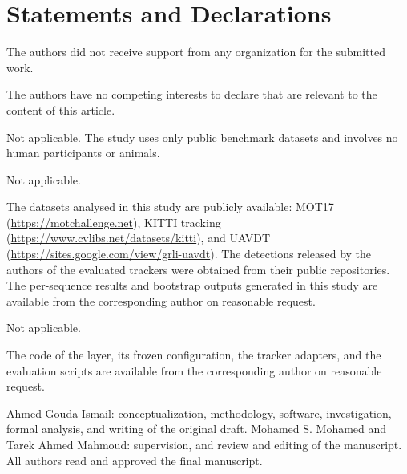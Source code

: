 \documentclass[pdflatex,referee,sn-mathphys-num]{sn-jnl}
\begin{document}
\maketitle











\backmatter

\section*{Statements and Declarations}

The authors did not receive support from any organization for the submitted work.

The authors have no competing interests to declare that are relevant to the content of this
article.

Not applicable. The study uses only public benchmark datasets and involves no human participants
or animals.

Not applicable.

The datasets analysed in this study are publicly available: MOT17
(\url{https://motchallenge.net}), KITTI tracking (\url{https://www.cvlibs.net/datasets/kitti}), and UAVDT
(\url{https://sites.google.com/view/grli-uavdt}).
The detections released by the authors of the evaluated trackers were obtained from their public
repositories. The per-sequence results and bootstrap outputs generated in this study are available
from the corresponding author on reasonable request.

Not applicable.

The code of the layer, its frozen configuration, the tracker adapters, and the evaluation scripts
are available from the corresponding author on reasonable request.

Ahmed Gouda Ismail: conceptualization, methodology, software, investigation, formal analysis, and
writing of the original draft. Mohamed S. Mohamed and Tarek Ahmed Mahmoud: supervision, and
review and editing of the manuscript. All authors read and approved the final manuscript.


\end{document}
